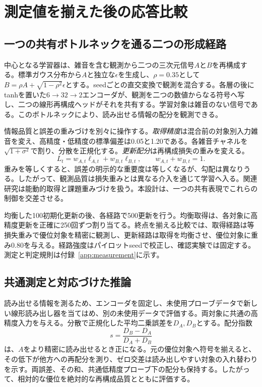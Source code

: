 \section{測定値を揃えた後の応答比較}
\label{sec:design}
\subsection{一つの共有ボトルネックを通る二つの形成経路}
中心となる学習器は、雑音を含む観測から二つの三次元信号$A$と$B$を再構成する。標準ガウス分布から$A$と独立な$\epsilon$を生成し、$\rho=0.35$として$B=\rho A+\sqrt{1-\rho^2}\epsilon$とする。seedごとの直交変換で観測を混合する。各層の後にtanhを置いた$6\to32\to2$エンコーダが、観測を二つの数値からなる符号へ写し、二つの線形再構成ヘッドがそれを共有する。学習対象は雑音のない信号である。このボトルネックにより、読み出せる情報の配分を観測できる。

情報品質と誤差の重みづけを別々に操作する。\emph{取得精度}は混合前の対象別入力雑音を変え、高精度・低精度の標準偏差は0.05と1.20である。各雑音チャネルを$\sqrt{1+\sigma^2}$で割り、分散を正規化する。\emph{更新配分}は再構成損失の重みを変える。
\begin{equation}
L_t=w_{A,t}\ell_{A,t}+w_{B,t}\ell_{B,t},\qquad w_{A,t}+w_{B,t}=1.
\label{eq:loss}
\end{equation}
重みを等しくすると、誤差の明示的な重要度は等しくなるが、勾配は異なりうる。したがって、観測品質は損失重みとは異なる介入を通じて学習へ入る。関連研究は能動的取得と課題重みづけを扱う\citep{shim2018joint,chen2022active,chen2018gradnorm,yu2020gradient}。本設計は、一つの共有表現でこれらの制御を交差させる。

均衡した100初期化更新の後、各経路で500更新を行う。均衡取得は、各対象に高精度更新を正確に250回ずつ割り当てる。終点を揃える比較では、取得経路は等損失重みで優位対象を精密に観測し、更新経路は取得を均衡させ、優位対象に重み0.80を与える。経路強度はパイロットseedで校正し、確認実験では固定する。測定と判定規則は付録~\ref{app:measurement}に示す。

\subsection{共通測定と対応づけた推論}
読み出せる情報を測るため、エンコーダを固定し、未使用プローブデータで新しい線形読み出し器を当てはめ、別の未使用データで評価する。両対象に共通の高精度入力を与える。分散で正規化した平均二乗誤差を$D_A,D_B$とする。配分指数
\begin{equation}
s=\frac{D_B-D_A}{D_A+D_B}
\label{eq:s}
\end{equation}
は、$A$をより精密に読み出せるとき正になる。元の優位対象へ符号を揃えると、その低下が他方への再配分を測り、ゼロ交差は読み出しやすい対象の入れ替わりを示す。両誤差、その和、共通低精度プローブ下の配分も保持する。したがって、相対的な優位を絶対的な再構成品質とともに評価する。

